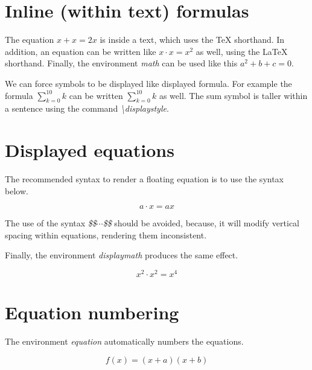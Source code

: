 \documentclass{article}
\begin{document}
\section*{Inline (within text) formulas}

The equation $x + x = 2x$ is inside a text, which uses the \TeX{} shorthand.
In addition, an equation can be written like \(x \cdot x = x^2\) as well, using the \LaTeX{} shorthand.
Finally, the environment \emph{math} can be used like this \begin{math}a^2 + b + c = 0\end{math}.

We can force symbols to be displayed like displayed formula. For example the formula $\sum_{k=0}^{10}k$ can be written $\displaystyle\sum_{k=0}^{10}k$ as well. The sum symbol is taller within a sentence using the command \emph{\textbackslash displaystyle}.

\section*{Displayed equations}

The recommended syntax to render a floating equation is to use the syntax below.

\[a \cdot x = ax \]

The use of the syntax \emph{\$\$$\cdots$\$\$} should be avoided, because, it will modify vertical spacing within equations, rendering them inconsistent.

Finally, the environment \emph{displaymath} produces the same effect.

\begin{displaymath}
	x^2 \cdot x^2 = x^4
\end{displaymath}

\section*{Equation numbering}

The environment \emph{equation} automatically numbers the equations.

\begin{equation} 
	f(x)=(x+a)(x+b)
\end{equation}
\end{document}
